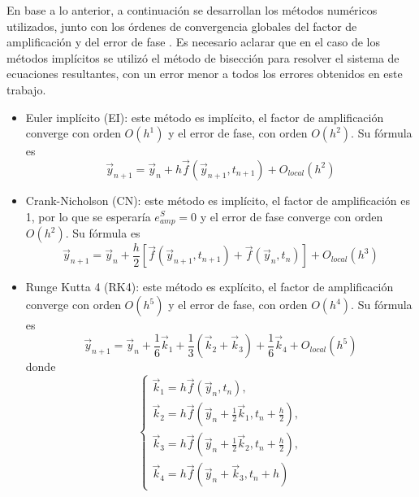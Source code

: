 \documentclass[aps,prb,twocolumn,superscriptaddress,floatfix,longbibliography,10pt]{revtex4-2}
\newcounter{para}
\begin{document}
En base a lo anterior, a continuación se desarrollan los métodos numéricos utilizados, junto con los órdenes de convergencia globales del factor de amplificación  y del error de fase \cite{Notas_materia}. Es necesario aclarar que en el caso de los métodos implícitos se utilizó el método de bisección para resolver el sistema de ecuaciones resultantes, con un error menor a todos los errores obtenidos en este trabajo.
\begin{itemize}
  \item Euler implícito (EI): este método es implícito, el factor de amplificación converge con orden $O(h^1)$ y el error de fase, con orden $O(h^2)$. Su fórmula es
  \begin{equation}
    \vec{y}_{n+1} = \vec{y}_n + h \vec{f}(\vec{y}_{n+1}, t_{n+1}) + O_{local}(h^2)
    \label{eq:Euler_implicito}
  \end{equation}

  \item Crank-Nicholson (CN): este método es implícito, el factor de amplificación es 1, por lo que se esperaría $e^S_{amp} = 0$ y el error de fase converge con orden $O(h^2)$. Su fórmula es
  \begin{equation}
    \vec{y}_{n+1} = \vec{y}_n + \frac{h}{2} [ \vec{f}(\vec{y}_{n+1}, t_{n+1}) + \vec{f}(\vec{y}_{n}, t_{n}) ]+ O_{local}(h^3)
    \label{eq:Crank_Nicholson}
  \end{equation}

  \item Runge Kutta 4 (RK4): este método es explícito, el factor de amplificación converge con orden $O(h^5)$ y el error de fase, con orden $O(h^4)$. Su fórmula es
  \begin{equation}
    \vec{y}_{n+1} = \vec{y}_n + \frac{1}{6} \vec{k}_1 + \frac{1}{3} (\vec{k}_2 + \vec{k}_3) + \frac{1}{6} \vec{k}_4 + O_{local}(h^5)
    \label{eq:Runge_Kutta_4}
  \end{equation}
  donde
  \[
    \left\{\begin{matrix}
      \vec{k}_1 = h \vec{f}(\vec{y}_n, t_n), \\ 
      \vec{k}_2 = h \vec{f} \left( \vec{y}_n + \frac{1}{2} \vec{k}_1 , t_n + \frac{h}{2}\right), \\
      \vec{k}_3 = h \vec{f} \left ( \vec{y}_n + \frac{1}{2} \vec{k}_2 , t_n + \frac{h}{2}  \right ), \\
      \vec{k}_4 = h \vec{f}(\vec{y}_n + \vec{k}_3, t_n + h)
    \end{matrix}\right.
  \]


\end{itemize}
\end{document}
